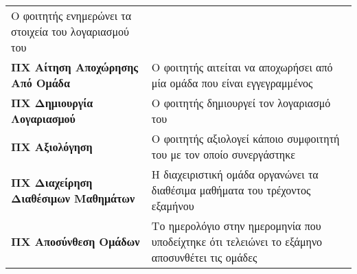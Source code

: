 \documentclass[
]{article}
\begin{document}
\begin{longtable}[]{@{}ll@{}}
\begin{minipage}[t]{0.59\columnwidth}
Ο φοιτητής ενημερώνει τα στοιχεία του λογαριασμού του\strut
\end{minipage}\tabularnewline
\begin{minipage}[t]{0.35\columnwidth}\raggedright
\textbf{ΠΧ Αίτηση Αποχώρησης Από Ομάδα}\strut
\end{minipage} & \begin{minipage}[t]{0.59\columnwidth}\raggedright
Ο φοιτητής αιτείται να αποχωρήσει από μία ομάδα που είναι
εγγεγραμμένος\strut
\end{minipage}\tabularnewline
\begin{minipage}[t]{0.35\columnwidth}\raggedright
\textbf{ΠΧ Δημιουργία Λογαριασμού}\strut
\end{minipage} & \begin{minipage}[t]{0.59\columnwidth}\raggedright
Ο φοιτητής δημιουργεί τον λογαριασμό του\strut
\end{minipage}\tabularnewline
\begin{minipage}[t]{0.35\columnwidth}\raggedright
\textbf{ΠΧ Αξιολόγηση}\strut
\end{minipage} & \begin{minipage}[t]{0.59\columnwidth}\raggedright
Ο φοιτητής αξιολογεί κάποιο συμφοιτητή του με τον οποίο
συνεργάστηκε\strut
\end{minipage}\tabularnewline
\begin{minipage}[t]{0.35\columnwidth}\raggedright
\textbf{ΠΧ Διαχείρηση Διαθέσιμων Μαθημάτων}\strut
\end{minipage} & \begin{minipage}[t]{0.59\columnwidth}\raggedright
Η διαχειριστική ομάδα οργανώνει τα διαθέσιμα μαθήματα του τρέχοντος
εξαμήνου\strut
\end{minipage}\tabularnewline
\begin{minipage}[t]{0.35\columnwidth}\raggedright
\textbf{ΠΧ Αποσύνθεση Ομάδων}\strut
\end{minipage} & \begin{minipage}[t]{0.59\columnwidth}\raggedright
Το ημερολόγιο στην ημερομηνία που υποδείχτηκε ότι τελειώνει το εξάμηνο
αποσυνθέτει τις ομάδες\strut
\end{minipage}\tabularnewline
\bottomrule
\end{longtable}
\end{document}
